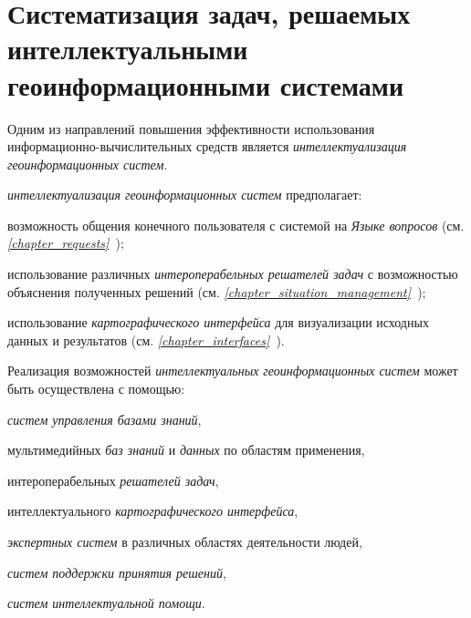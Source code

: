 \section{Систематизация задач, решаемых интеллектуальными геоинформационными системами}
\label{chapter_gis_sec_tasks}

Одним из направлений повышения эффективности использования информационно-вычислительных средств является \textit{интеллектуализация геоинформационных систем}.

\textit{интеллектуализация геоинформационных систем} предполагает:
\begin{textitemize}
	\item возможность общения конечного пользователя с системой на \textit{Языке вопросов} (см. \textit{\ref{chapter_requests}~});
	\item использование различных \textit{интероперабельных решателей задач} с возможностью объяснения полученных решений (см. \textit{\ref{chapter_situation_management}~}); 
	\item использование \textit{картографического интерфейса} для визуализации исходных данных и результатов (см. \textit{\ref{chapter_interfaces}~}).
\end{textitemize}

Реализация возможностей \textit{интеллектуальных геоинформационных систем} может быть осуществлена с помощью:
\begin{textitemize}
	\item \textit{систем управления базами знаний},
	\item мультимедийных \textit{баз знаний} и \textit{данных} по областям применения,
	\item интероперабельных \textit{решателей задач},
	\item интеллектуального \textit{картографического интерфейса},
	\item \textit{экспертных систем} в различных областях деятельности людей,
	\item \textit{систем поддержки принятия решений},
	\item \textit{систем интеллектуальной помощи}.
\end{textitemize}

